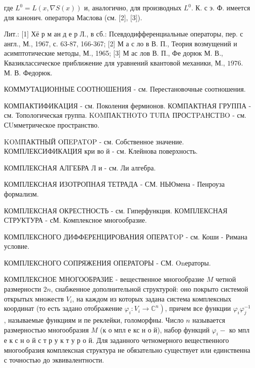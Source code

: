 \documentclass[10pt]{article}
\begin{document}
где $L^{0}=L(x, \nabla S(x))$ и, аналогично, для производных $L^{0}$. К. с э. Ф. имеется для канонич. оператора Маслова (см. [2], [3]).



Лит.: [1] Хё р м ан д е р Л., в сб.: Псевдодифференциальные операторы, пер. с англ., М., 1967, с. 63-87, 166-367; [2] М а с ло в В. П., Теория возмущений и асимптотические методы, М., 1965; [3] М ас лов В. П., Фе дорюк М. В., Квазиклассическое приближение для уравнений квантовой механики, М., $1976 . \quad$ М. В. Федорюк.



КОММУТАЦИОННЫЕ СООТНОШЕНИЯ - см. Перестановочные соотношения.



КОМПАКТИФИКАЦИЯ - см. Поколения фермионов. КОМПАКТНАЯ ГРУППА - см. Топологическая группа. KOMПАKTHOTO TUПA ПРОСTPAНСTBO - см. СUмметрическое пространство.



KOMПАКТНЫЙ OПEPATOP - см. Собственное значение. КОМПЛЕКСИФИКАЦИЯ кри во й - см. Клейнова поверхность.



КОМПЛЕКСНАЯ АЛГЕБРА Л и - см. Ли алгебра.



КОМПЛЕКСНАЯ ИЗОТРОПНАЯ ТЕТРАДА - СМ. НЬЮмена - Пенроуза формализм.



КОМПЛЕКСНАЯ ОКРЕСТНОСТЬ - см. Гиперфункция. КОМПЛЕКСНАЯ СТРУКТУРА - сМ. Комплексное многообразие.



КОМПЛЕКСНОГО ДИФФЕРЕНЦИРОВАНИЯ ОПЕРАTOP - см. Коши - Римана условие.



КОМПЛЕКСНОГО СОПРЯЖЕНИЯ ОПЕРАТОРЫ - СМ. Onераторы.



КОМПЛЕКСНОЕ МНОГООБРАЗИЕ - вещественное многообразие $M$ четной размерности $2 n$, снабженное дополнительной структурой: оно покрыто системой открытых множеств $V_{i}$, на каждом из которых задана система комплексных координат (то есть задано отображение $\left.\varphi_{i}: V_{i} \rightarrow \mathbb{C}^{n}\right)$, причем все функции $\varphi_{i} \varphi_{j}^{-1}$, называемые функциям и пе реклейки, голоморфны. Число $n$ называется размерностью многообразия $M$ (к о мпл е кс н о й), набор функций $\varphi_{i}-$ ко мпл е к с н о й с т р у к т у р о й. Для заданного четномерного вещественного многообразия комплексная структура не обязательно существует или единственна с точностью до эквивалентности.
\end{document}
